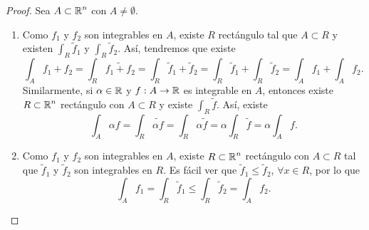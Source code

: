 \begin{proof} Sea $\displaystyle A \subset \mathbb{R}^{n} $ con $\displaystyle A \neq \emptyset $. 
\begin{enumerate}
\item Como $\displaystyle f_{1} $ y $\displaystyle f_{2} $ son integrables en $\displaystyle A $, existe $\displaystyle R $ rectángulo tal que $\displaystyle A \subset R $ y existen $\displaystyle \int _{R}\tilde{f}_{1} $ y $\displaystyle \int _{R}\tilde{f}_{2} $.
Así, tendremos que existe
\[\int _{A}f_{1} + f_{2} = \int _{R}\widetilde{f_{1} + f_{2}} = \int _{R}\tilde{f}_{1} + \tilde{f}_{2} =  \int _{R}\tilde{f}_{1} +\int _{R}\tilde{f}_{2} = \int _{A}f_{1} +\int _{A}f_{2} .\]
Similarmente, si $\displaystyle \alpha \in \mathbb{R} $ y $\displaystyle f : A \to \mathbb{R} $ es integrable en $\displaystyle A $, entonces existe $\displaystyle R \subset \mathbb{R}^{n} $ rectángulo con $\displaystyle A \subset R $ y existe $\displaystyle \int _{R}\tilde{f}  $. Así, existe
\[\int _{A}\alpha f = \int _{R}\widetilde{\alpha f} = \int _{R}\alpha\tilde{f} = \alpha \int _{R}\tilde{f} = \alpha\int _{A}f .\]
\item Como $\displaystyle f_{1} $ y $\displaystyle f_{2} $ son integrables en $\displaystyle A $, existe $\displaystyle R \subset \mathbb{R}^{n} $ rectángulo con $\displaystyle A \subset R $ tal que $\displaystyle \tilde{f}_{1} $ y $\displaystyle \tilde{f}_{2} $ son integrables en $\displaystyle R $. Es fácil ver que $\displaystyle \tilde{f}_{1} \leq \tilde{f}_{2} $, $\displaystyle \forall x \in R $, por lo que 
	\[\int _{A}f_{1} = \int _{R}\tilde{f}_{1} \leq \int _{R}\tilde{f}_{2} =\int _{A}f_{2}  .\]
\end{enumerate}
\end{proof}

